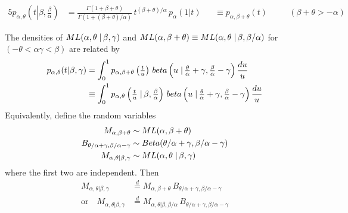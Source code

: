 \documentclass[10pt,a4paper]{amsart}
\begin{document}
\begin{alignat}{5}
p_{\alpha,\theta}\left(t \left. \right\vert \beta,\tfrac{\beta}{\alpha}\right) 
&= \frac{\Gamma(1+\beta+\theta)}{\Gamma\left(1+(\beta+\theta)/\alpha\right)} \, 
t^{(\beta+\theta)/\alpha} \, p_\alpha(1\vert  t)  &&\equiv p_{\alpha,\beta+\theta}(t) \quad &&(\beta+\theta>-\alpha) 
\label{eq:ML4par_identity}
\end{alignat}

\begin{proposition}
\label{prop:rho_Linnik_convdensitygen_beta}
The densities of ${\rm ML}(\alpha,\theta \left.\right\vert \beta,\gamma)$  and 
${\rm ML}(\alpha,\beta+\theta) \equiv {\rm ML}(\alpha,\theta \left.\right\vert \beta,\beta/\alpha)$ 
for $(-\theta<\alpha\gamma<\beta)$ are related by
\begin{align}
p_{\alpha,\theta}(t\vert \beta, \gamma)
 &= \int_0^1 p_{\alpha,\beta+\theta}\left(\tfrac{t}{u}\right) \, 
 {\rm beta} \left(u \left.\right\vert \tfrac{\theta}{\alpha}+\gamma, \tfrac{\beta}{\alpha}-\gamma\right) \frac{du}{u}
 \label{eq:rho_Linnik_convdensitygen_beta} \\
 &\equiv \int_0^1 p_{\alpha,\theta}\left(\tfrac{t}{u} \left. \right\vert \beta,\tfrac{\beta}{\alpha}\right) \, 
 {\rm beta} \left(u \left.\right\vert \tfrac{\theta}{\alpha}+\gamma, \tfrac{\beta}{\alpha}-\gamma\right) \frac{du}{u}
 \label{eq:rho_Linnik_convdensitygen_beta_1}
  \end{align}
Equivalently, define   the random variables 
\begin{align*}
M_{\alpha,\beta+\theta} &\sim {\rm ML}(\alpha,\beta+\theta) \\
B_{\theta/\alpha+\gamma,\beta/\alpha-\gamma} &\sim {\rm Beta}(\theta/\alpha+\gamma,\beta/\alpha-\gamma) \\
M_{\alpha,\theta\vert\beta,\gamma} &\sim {\rm ML}(\alpha,\theta \left.\right\vert \beta,\gamma)
\end{align*}
where the first two are independent. 
Then 
 \begin{align}
 M_{\alpha,\theta\vert\beta,\gamma} &\overset{d}{=} M_{\alpha,\beta+\theta} \, B_{\theta/\alpha+\gamma,\beta/\alpha-\gamma}
  \label{eq:ML4par_rvproduct} \\
  \textrm{or}\quad
 M_{\alpha,\theta\vert\beta,\gamma} &\overset{d}{=} 
 M_{\alpha,\theta\vert\beta,\beta/\alpha} \, B_{\theta/\alpha+\gamma,\beta/\alpha-\gamma}
  \label{eq:ML4par_rvproduct1}
 \end{align}
  \end{proposition}
\end{document}
